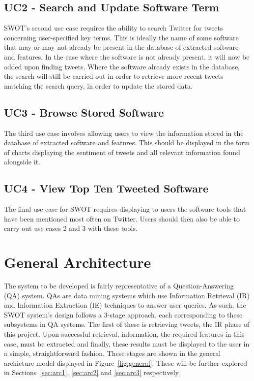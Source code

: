 \subsection[Use Case 2]{UC2 - Search and Update Software Term}
\label{sec:uc2}
SWOT's second use case requires the ability to search Twitter for tweets concerning user-specified key terms. This is ideally the name of some software that may or may not already be present in the database of extracted software and features. In the case where the software is not already present, it will now be added upon finding tweets. Where the software already exists in the database, the search will still be carried out in order to retrieve more recent tweets matching the search query, in order to update the stored data.

\subsection[Use Case 3]{UC3 - Browse Stored Software}
\label{sec:uc3}
The third use case involves allowing users to view the information stored in the database of extracted software and features. This should be displayed in the form of charts displaying the sentiment of tweets and all relevant information found alongside it.

\subsection[Use Case 4]{UC4 - View Top Ten Tweeted Software}
\label{sec:uc4}
The final use case for SWOT requires displaying to users the software tools that have been mentioned most often on Twitter. Users should then also be able to carry out use cases 2 and 3 with these tools.

\section{General Architecture}
The system to be developed is fairly representative of a Question-Answering (QA) system. QAs are data mining systems which use Information Retrieval (IR) and Information Extraction (IE) techniques to answer user queries. As such, the SWOT system's design follows a 3-stage approach, each corresponding to these subsystems in QA systems. The first of these is retrieving tweets, the IR phase of this project. Upon successful retrieval, information, the required features in this case, must be extracted and finally, these results must be displayed to the user in a simple, straightforward fashion.
These stages are shown in the general archicture model displayed in Figure~\ref{fig:general}. These will be further explored in Sections~\ref{sec:arc1}, \ref{sec:arc2} and \ref{sec:arc3} respectively.

